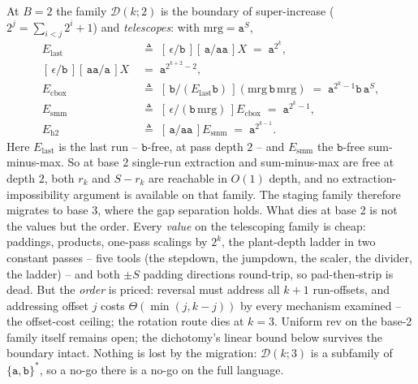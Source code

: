 \documentclass[runningheads,envcountsect]{llncs}
\begin{document}
\begin{proposition}
    \label{dich:prop:boundary}
    At $B = 2$ the family $\mathcal D(k;2)$ is the boundary of super-increase ($2^{j} = \sum_{i<j} 2^{i} + 1$) and \emph{telescopes}: with $\mathrm{mrg} = \mathtt a^{S}$,
    \begin{align*}
        E_{\mathrm{last}} \;&\triangleq\; [\,\epsilon/\mathtt b\,][\,\mathtt a/\mathtt{aa}\,]X \;=\; \mathtt a^{2^{k}},\\
        [\,\epsilon/\mathtt b\,][\,\mathtt{aa}/\mathtt a\,]X \;&=\; \mathtt a^{2^{k+2}-2},\\
        E_{\mathrm{cbox}} \;&\triangleq\; [\,\mathtt b/(E_{\mathrm{last}}\mathtt b)\,](\mathrm{mrg}\,\mathtt b\,\mathrm{mrg}) \;=\; \mathtt a^{2^{k}-1}\mathtt b\,\mathtt a^{S},\\
        E_{\mathrm{smm}} \;&\triangleq\; [\,\epsilon/(\mathtt b\,\mathrm{mrg})\,]E_{\mathrm{cbox}} \;=\; \mathtt a^{2^{k}-1},\\
        E_{\mathrm{h2}} \;&\triangleq\; [\,\mathtt a/\mathtt{aa}\,]E_{\mathrm{smm}} \;=\; \mathtt a^{2^{k-1}}.
    \end{align*}
    Here $E_{\mathrm{last}}$ is the last run -- $\mathtt b$-free, at pass depth $2$ -- and $E_{\mathrm{smm}}$ the $\mathtt b$-free sum-minus-max. So at base 2 single-run extraction and sum-minus-max are free at depth $2$, both $r_k$ and $S - r_k$ are reachable in $O(1)$ depth, and no extraction-impossibility argument is available on that family. The staging family therefore migrates to base 3, where the gap separation holds. What dies at base 2 is not the values but the order. Every \emph{value} on the telescoping family is cheap: paddings, products, one-pass scalings by $2^{k}$, the plant-depth ladder in two constant passes -- five tools (the stepdown, the jumpdown, the scaler, the divider, the ladder) -- and both $\pm S$ padding directions round-trip, so pad-then-strip is dead. But the \emph{order} is priced: reversal must address all $k{+}1$ run-offsets, and addressing offset $j$ costs $\Theta(\min(j, k{-}j))$ by every mechanism examined -- the offset-cost ceiling; the rotation route dies at $k = 3$. Uniform $\mathrm{rev}$ on the base-2 family itself remains open; the dichotomy's linear bound below survives the boundary intact. Nothing is lost by the migration: $\mathcal D(k;3)$ is a subfamily of $\{\mathtt a, \mathtt b\}^{*}$, so a no-go there is a no-go on the full language.
\end{proposition}
\end{document}
